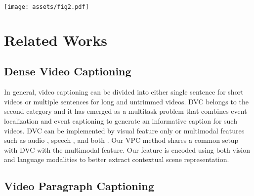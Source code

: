 \documentclass[letterpaper]{article} \usepackage{aaai23}  \usepackage{times}  \usepackage{helvet}  \usepackage{courier}  \usepackage[hyphens]{url}  \usepackage{graphicx} \urlstyle{rm} \def\UrlFont{\rm}  \usepackage{natbib}  \usepackage{caption} \frenchspacing  \setlength{\pdfpagewidth}{8.5in}  \setlength{\pdfpageheight}{11in}  \usepackage{algorithm}
\newcommand{\encoder}{VL Encoder\xspace}
\begin{document}
\begin{figure*}[!t]
  \centering
  \texttt{[image: assets/fig2.pdf]}
\caption{Overall network architecture of our proposed \model, which contains two modules, i.e., \encoder and TinT Decoder. (Left) \encoder: given a snippet $X_i$, the \encoder simultaneously extracts local visual features from main agents, global visual features from the environment, and linguistic relevant scene elements; and models interaction between those three modalities through our M2RF module. (Right) TinT Decoder: the canonical transformer encoder is extended by an autoregressive outer transformer that can selectively access the $1^{st}$ to ${t-1}^{th}$ hidden states, which are stored in the event memory, at the $t^{th}$ event captioning step.}
\label{fig:overall}
\vspace{-4mm}
\end{figure*}

\section{Related Works}



\subsection{Dense Video Captioning} 
In general, video captioning can be divided into either single sentence \cite{pasunuru2017multi, wang2019vatex} for short videos or multiple sentences \cite{wang2020event} for long and untrimmed videos. DVC belongs to the second category and it has emerged as a multitask problem that combines event localization and event captioning to generate an informative caption for such videos. DVC can be implemented by visual feature only \cite{krishna2017dense, li2018jointly, zhou2018end, mun2019streamlined, deng2021sketch} or multimodal features such as audio \cite{rahman2019watch}, speech \cite{shi2019dense, iashin2020multi}, and both \cite{iashin2020multi}. Our VPC method shares a common setup with DVC with the multimodal feature. Our feature is encoded using both vision and language modalities to better extract contextual scene representation.

\subsection{Video Paragraph Captioning} 
\end{document}

